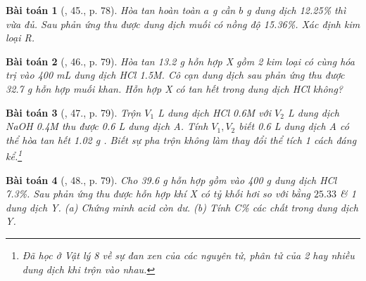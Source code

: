 \documentclass{article}
\newtheorem{baitoan}{Bài toán}
\begin{document}
\begin{baitoan}[\cite{An_Hoa_Hoc_nang_cao_8_9}, 45., p. 78]
	Hòa tan hoàn toàn $a$ \emph{g } cần $b$ \emph{g} dung dịch \emph{ 12.25\%} thì vừa đủ. Sau phản ứng thu được dung dịch muối có nồng độ \emph{15.36\%}. Xác định kim loại R.
\end{baitoan}

\begin{baitoan}[\cite{An_Hoa_Hoc_nang_cao_8_9}, 46., p. 79]
	Hòa tan \emph{13.2 g} hỗn hợp X gồm 2 kim loại có cùng hóa trị vào \emph{400 mL} dung dịch \emph{HCl 1.5M}. Cô cạn dung dịch sau phản ứng thu được \emph{32.7 g} hỗn hợp muối khan. Hỗn hợp X có tan hết trong dung dịch \emph{HCl} không?
\end{baitoan}

\begin{baitoan}[\cite{An_Hoa_Hoc_nang_cao_8_9}, 47., p. 79]
	Trộn $V_1$ \emph{L} dung dịch \emph{HCl 0.6M} với $V_2$ \emph{L} dung dịch \emph{NaOH 0.4M} thu được \emph{0.6 L} dung dịch A. Tính $V_1,V_2$ biết \emph{0.6 L} dung dịch A có thể hòa tan hết \emph{1.02 g }. Biết sự pha trộn không làm thay đổi thể tích 1 cách đáng kể.\footnote{Đã học ở Vật lý 8 về sự đan xen của các nguyên tử, phân tử của 2 hay nhiều dung dịch khi trộn vào nhau.}
\end{baitoan}

\begin{baitoan}[\cite{An_Hoa_Hoc_nang_cao_8_9}, 48., p. 79]
	Cho \emph{39.6 g} hỗn hợp gồm \emph{} vào \emph{400 g} dung dịch \emph{HCl 7.3\%}. Sau phản ứng thu được hỗn hợp khí X có tỷ khối hơi so với \emph{} bằng $25.33$ \& 1 dung dịch Y. (a) Chứng minh acid còn dư. (b) Tính C\% các chất trong dung dịch Y.
\end{baitoan}


\printbibliography[heading=bibintoc]
	
\end{document}
